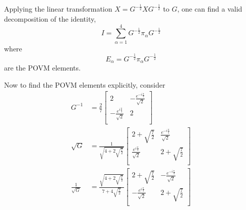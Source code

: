 Applying the linear transformation $X = G^{-\frac{1}{2}}X G^{-\frac{1}{2}}$ to $G$, one can find a valid decomposition of the identity,
$$
I = \sum_{\alpha=1}^{4} G^{-\frac{1}{2}} \pi_{\alpha} G^{-\frac{1}{2}}
$$
where 
$$
E_{\alpha} = G^{-\frac{1}{2}} \pi_{\alpha} G^{-\frac{1}{2}}
$$ 
are the POVM elements.

Now to find the POVM elements explicitly, consider
\begin{align*}
G^{-1} & = \frac{2}{7}
\begin{bmatrix}
2 & -\frac{e^{-i\frac{\pi}{4}}}{\sqrt{2}} \\ 
-\frac{e^{i\frac{\pi}{4}}}{\sqrt{2}} & 2\\ 
\end{bmatrix}\\
\sqrt{G} & = \frac{1}{\sqrt{4+2\sqrt{\frac{7}{2}}}}
\begin{bmatrix}
2+\sqrt{\frac{7}{2}} & \frac{e^{-i\frac{\pi}{4}}}{\sqrt{2}}\\ 
\frac{e^{i\frac{\pi}{4}}}{\sqrt{2}} & 2+\sqrt{\frac{7}{2}}\\ 
\end{bmatrix}\\
\frac{1}{\sqrt{G}} & = \frac{\sqrt{4+2\sqrt{\frac{7}{2}}}}{7+4\sqrt{\frac{7}{2}}}
\begin{bmatrix}
2+\sqrt{\frac{7}{2}} & -\frac{e^{-i\frac{\pi}{4}}}{\sqrt{2}}\\ 
-\frac{e^{i\frac{\pi}{4}}}{\sqrt{2}} & 2+\sqrt{\frac{7}{2}}\\ 
\end{bmatrix}
\end{align*}

